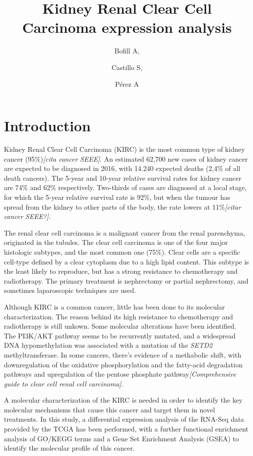 \documentclass[9pt,twocolumn,twoside]{gsajnl}
\title{Kidney Renal Clear Cell Carcinoma expression analysis}
\author[$\ast$1]{Bofill A,}
\author[$\ast$1]{Castillo S,}
\author[$\ast$1]{Pérez A}
\affil[$\ast$]{Msc in Bioinformatics for Health Sciences, Pompeu Fabra University}
\begin{document}
\maketitle
\thispagestyle{firststyle}
\marginmark
\firstpagefootnote
{}
\vspace{-11pt}%


\section*{Introduction}

Kidney Renal Clear Cell Carcinoma (KIRC) is the most common type of kidney cancer (95\%)\emph{[cita cancer SEEE]}.  An estimated 62,700 new cases of kidney cancer are expected to be diagnosed in 2016, with 14.240 expected deaths (2,4\% of all death cancers).   The  5-year  and  10-year  relative  survival  rates  for  kidney  
cancer are 74\% and 62\% respectively.  Two-thirds of cases 
 are diagnosed at a local stage, for which the 5-year relative 
survival  rate  is  92\%, but when the tumour has spread from the kidney to other parts of the body, the rate lowers at 11\%\emph{[citar cancer SEEE?]}. 

The renal clear cell carcinoma is a malignant cancer from the renal parenchyma, originated in the tubules. The clear cell carcinoma is one of the four major histologic subtypes, and the most common one (75\%). Clear cells are a specific cell-type defined by a clear cytoplasm due to a high lipid content. This subtype is the least likely to reproduce, but has a strong resistance to chemotherapy and radiotherapy. The primary treatment is nephrectomy or partial nephrectomy, and sometimes laparoscopic techniques are used. 
	

Although KIRC is a common cancer, little has been done to its molecular characterization. The reason behind its high resistance to chemotherapy and radiotherapy is still unkown. Some molecular alterations have been identified. The PI3K/AKT pathway seems to be recurrently mutated, and a widespread DNA hypomethylation was associated with a mutation of the \textit{SETD2} methyltransferase. In some cancers, there's evidence of a methabolic shift, with downregulation of the oxidative phosphorylation  and the fatty-acid degradation pathways and upregulation of the pentose phosphate pathway\emph{[Comprehensive guide to clear cell renal cell carcinoma]}.

A molecular characterization of the KIRC is needed in order to identify the key molecular mechanisms that cause this cancer and target them in novel treatments. In this study,  a differential expression analysis of the RNA-Seq data provided by the TCGA has been performed, with a further functional enrichment analysis of GO/KEGG terms and a Gene Set Enrichment Analysis (GSEA) to identify the molecular profile of this cancer.
\end{document}
